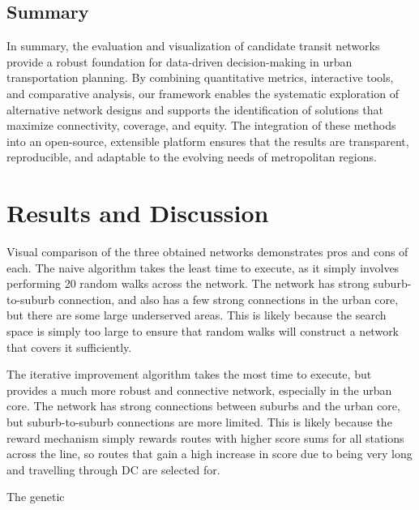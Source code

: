 \documentclass[manuscript]{acmart}
\begin{document}
\subsection{Summary}
In summary, the evaluation and visualization of candidate transit networks provide a robust foundation for data-driven decision-making in urban transportation planning. By combining quantitative metrics, interactive tools, and comparative analysis, our framework enables the systematic exploration of alternative network designs and supports the identification of solutions that maximize connectivity, coverage, and equity. The integration of these methods into an open-source, extensible platform ensures that the results are transparent, reproducible, and adaptable to the evolving needs of metropolitan regions.

\section{Results and Discussion}

Visual comparison of the three obtained networks demonstrates pros and cons of each. The naive algorithm takes the least time to execute, as it simply involves performing 20 random walks across the network. The network has strong suburb-to-suburb connection, and also has a few strong connections in the urban core, but there are some large underserved areas. This is likely because the search space is simply too large to ensure that random walks will construct a network that covers it sufficiently.

The iterative improvement algorithm takes the most time to execute, but provides a much more robust and connective network, especially in the urban core. The network has strong connections between suburbs and the urban core, but suburb-to-suburb connections are more limited. This is likely because the reward mechanism simply rewards routes with higher score sums for all stations across the line, so routes that gain a high increase in score due to being very long and travelling through DC are selected for.

The genetic
\end{document}
